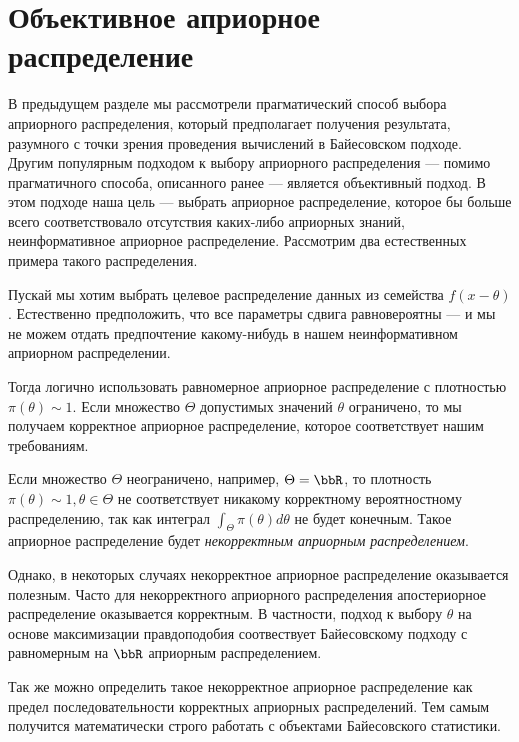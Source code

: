 \section{Объективное априорное распределение}

В предыдущем разделе мы рассмотрели прагматический способ выбора априорного распределения, 
который предполагает получения результата, разумного с точки зрения проведения вычислений в Байесовском подходе.
Другим популярным подходом к выбору априорного распределения 
--- помимо прагматичного способа, описанного ранее --- является объективный подход.
В этом подходе наша цель --- выбрать априорное распределение,
которое бы больше всего соответствовало отсутствия каких-либо априорных знаний, неинформативное априорное распределение.
Рассмотрим два естественных примера такого распределения.

\begin{example}
Пускай мы хотим выбрать целевое распределение данных из семейства $f(x - \theta)$. 
Естественно предположить, что все параметры сдвига равновероятны --- и мы не можем отдать предпочтение какому-нибудь в нашем неинформативном априорном распределении.

Тогда логично использовать равномерное априорное распределение с плотностью $\pi(\theta) \sim 1$.
Если множество $\Theta$ допустимых значений $\theta$ ограничено, то мы получаем корректное априорное распределение, 
которое соответствует нашим требованиям.

Если множество $\Theta$ неограничено, например, $\Theta = \bbR$, то плотность $\pi(\theta) \sim 1, \theta \in \Theta$
не соответствует никакому корректному вероятностному распределению, так как интеграл $\int_{\Theta} \pi(\theta) d\theta$ не будет конечным.
Такое априорное распределение будет \emph{некорректным априорным распределением}.

Однако, в некоторых случаях некорректное априорное распределение оказывается полезным.
Часто для некорректного априорного распределения апостериорное распределение оказывается корректным.
В частности, подход к выбору $\theta$ на основе максимизации правдоподобия соотвествует Байесовскому подходу с равномерным на $\bbR$ 
априорным распределением.

Так же можно определить такое некорректное априорное распределение как предел последовательности корректных априорных распределений.
Тем самым получится математически строго работать с объектами Байесовского статистики.
\end{example}

